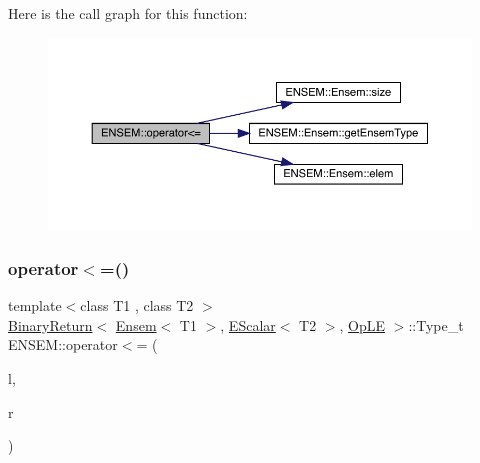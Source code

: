 Here is the call graph for this function\+:\nopagebreak
\begin{figure}[H]
\begin{center}
\leavevmode
\includegraphics[width=350pt]{d1/d9e/group__eensem_ga2a70dca80960fd84a701d582cced7d40_cgraph}
\end{center}
\end{figure}
\mbox{\label{group__eensem_gaf74453e608d97ecc1e832a7b2a8fe3de}} 
\subsubsection{\texorpdfstring{operator$<$=()}{operator<=()}\hspace{0.1cm}{\footnotesize\ttfamily [2/3]}}
{\footnotesize\ttfamily template$<$class T1 , class T2 $>$ \\
\mbox{\hyperlink{structENSEM_1_1BinaryReturn}{Binary\+Return}}$<$ \mbox{\hyperlink{classENSEM_1_1Ensem}{Ensem}}$<$ T1 $>$, \mbox{\hyperlink{classENSEM_1_1EScalar}{E\+Scalar}}$<$ T2 $>$, \mbox{\hyperlink{structENSEM_1_1OpLE}{Op\+LE}} $>$\+::Type\+\_\+t E\+N\+S\+E\+M\+::operator$<$= (\begin{DoxyParamCaption}\item[{const \mbox{\hyperlink{classENSEM_1_1Ensem}{Ensem}}$<$ T1 $>$ \&}]{l,  }\item[{const \mbox{\hyperlink{classENSEM_1_1EScalar}{E\+Scalar}}$<$ T2 $>$ \&}]{r }\end{DoxyParamCaption})\hspace{0.3cm}{\ttfamily [inline]}}

